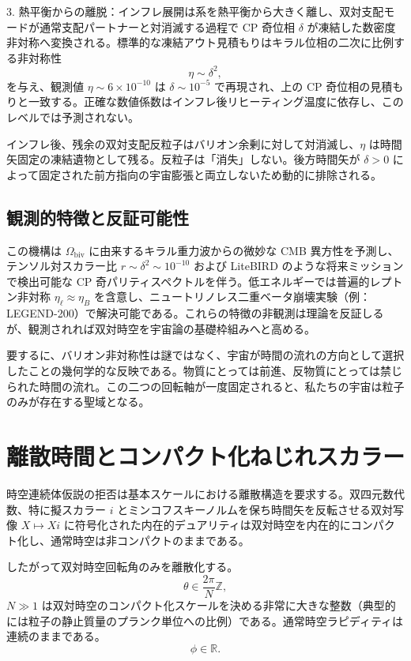 \documentclass[dvipdfmx,a4paper]{article}
\begin{document}
3. 熱平衡からの離脱：インフレ展開は系を熱平衡から大きく離し、双対支配モードが通常支配パートナーと対消滅する過程で CP 奇位相 $\delta$ が凍結した数密度非対称へ変換される。標準的な凍結アウト見積もりはキラル位相の二次に比例する非対称性
\[
\eta \sim \delta^2,
\]
を与え、観測値 $\eta \sim 6 \times 10^{-10}$ は $\delta \sim 10^{-5}$ で再現され、上の CP 奇位相の見積もりと一致する。正確な数値係数はインフレ後リヒーティング温度に依存し、このレベルでは予測されない。

インフレ後、残余の双対支配反粒子はバリオン余剰に対して対消滅し、$\eta$ は時間矢固定の凍結遺物として残る。反粒子は「消失」しない。後方時間矢が $\delta > 0$ によって固定された前方指向の宇宙膨張と両立しないため動的に排除される。

\subsection{観測的特徴と反証可能性}

この機構は $\Omega_\text{biv}$ に由来するキラル重力波からの微妙な CMB 異方性を予測し、テンソル対スカラー比 $r \sim \delta^2 \sim 10^{-10}$ および LiteBIRD のような将来ミッションで検出可能な CP 奇パリティスペクトルを伴う。低エネルギーでは普遍的レプトン非対称 $\eta_\ell \approx \eta_B$ を含意し、ニュートリノレス二重ベータ崩壊実験（例：LEGEND-200）で解決可能である。これらの特徴の非観測は理論を反証しるが、観測されれば双対時空を宇宙論の基礎枠組みへと高める。

要するに、バリオン非対称性は謎ではなく、宇宙が時間の流れの方向として選択したことの幾何学的な反映である。物質にとっては前進、反物質にとっては禁じられた時間の流れ。この二つの回転軸が一度固定されると、私たちの宇宙は粒子のみが存在する聖域となる。

\section{離散時間とコンパクト化ねじれスカラー}
\label{sec:discretetime}

時空連続体仮説の拒否は基本スケールにおける離散構造を要求する。双四元数代数、特に擬スカラー $i$ とミンコフスキーノルムを保ち時間矢を反転させる双対写像 $X \mapsto Xi$ に符号化された内在的デュアリティは双対時空を内在的にコンパクト化し、通常時空は非コンパクトのままである。

したがって双対時空回転角のみを離散化する。
\[
\theta \in \frac{2\pi}{N} \mathbb{Z},
\]
$N \gg 1$ は双対時空のコンパクト化スケールを決める非常に大きな整数（典型的には粒子の静止質量のプランク単位への比例）である。通常時空ラピディティは連続のままである。
\[
\phi \in \mathbb{R}.
\]
\end{document}
